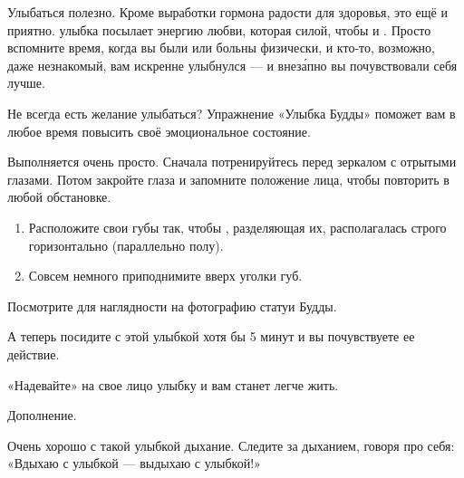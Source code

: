 Улыбаться полезно. Кроме выработки гормона радости для здоровья, это ещё и приятно.
 улыбка посылает энергию любви,
которая  силой, чтобы  и . Просто вспомните время, когда вы были  или больны физически, и кто-то, возможно, даже незнакомый, вам искренне улыбнулся --- и внез\'{а}пно вы почувствовали себя лучше.

Не всегда есть желание улыбаться? Упражнение «Улыбка Будды» поможет вам в любое время повысить своё эмоциональное состояние.

Выполняется очень просто. Сначала потренируйтесь перед зеркалом с отрытыми глазами.
Потом закройте глаза и запомните положение  лица,
чтобы повторить в любой обстановке.

\begin{enumerate}[noitemsep]
    \item Расположите свои губы так, чтобы ,
          разделяющая их, располагалась строго горизонтально (параллельно полу).
    \item Совсем немного приподнимите вверх уголки губ.
\end{enumerate}

Посмотрите для наглядности на фотографию статуи Будды.

А теперь посидите с этой улыбкой хотя бы 5 минут и вы почувствуете ее действие.

«Надевайте» на свое лицо улыбку и вам станет легче жить.

Дополнение.

Очень хорошо с такой улыбкой  дыхание.
Следите за дыханием, говоря про себя: «Вдыхаю с улыбкой --- выдыхаю с улыбкой!»
